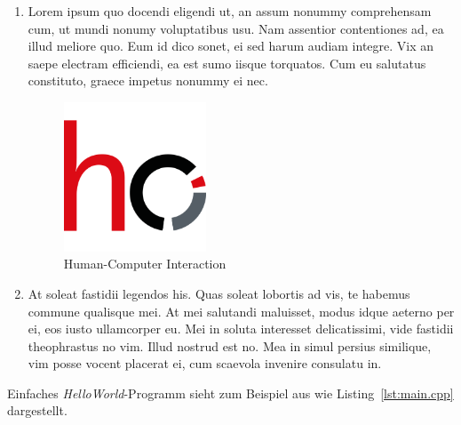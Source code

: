 \documentclass[a4paper,10pt]{article}
\begin{document}
\kopf
\renewcommand{\figurename}{Figure}

\begin{enumerate}

\item Lorem ipsum quo docendi eligendi ut, an assum nonummy comprehensam cum, ut mundi nonumy voluptatibus usu. Nam assentior contentiones ad, ea illud meliore quo. Eum id dico sonet, ei sed harum audiam integre. Vix an saepe electram efficiendi, ea est sumo iisque torquatos. Cum eu salutatus constituto, graece impetus nonummy ei nec.


\begin{figure}[ht]
\centering \includegraphics[width=0.4\textwidth]{images/uhh-hci.png}
\caption{Human-Computer Interaction}
\label{fig:wwu_logo}
\end{figure}

\item At soleat fastidii legendos his. Quas soleat lobortis ad vis, te habemus commune qualisque mei. At mei salutandi maluisset, modus idque aeterno per ei, eos iusto ullamcorper eu. Mei in soluta interesset delicatissimi, vide fastidii theophrastus no vim. Illud nostrud est no. Mea in simul persius similique, vim posse vocent placerat ei, cum scaevola invenire consulatu in.

\end{enumerate}


Einfaches \emph{HelloWorld}-Programm sieht zum Beispiel aus wie Listing~\ref{lst:main.cpp} dargestellt.

\end{document}
